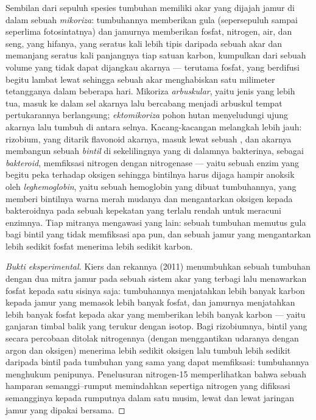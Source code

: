 \begin{proposition}\label{prop:b2:living-soil:symbiosis}
Sembilan dari sepuluh spesies tumbuhan memiliki akar yang dijajah jamur
di dalam sebuah \emph{mikoriza}: tumbuhannya memberikan gula
(sepersepuluh sampai seperlima fotosintatnya) dan jamurnya memberikan
fosfat, nitrogen, air, dan seng, yang hifanya, yang seratus kali lebih
tipis daripada sebuah akar dan memanjang seratus kali panjangnya tiap
satuan karbon, kumpulkan dari sebuah volume  yang tidak dapat
dijangkau akarnya --- terutama fosfat, yang berdifusi begitu lambat
lewat  sehingga sebuah akar menghabiskan satu milimeter
tetangganya dalam beberapa hari. Mikoriza \emph{arbuskular}, yaitu
jenis yang lebih tua, masuk ke dalam sel akarnya lalu bercabang menjadi
arbuskul tempat pertukarannya berlangsung; \emph{ektomikoriza} pohon
hutan menyeludungi ujung akarnya lalu tumbuh di antara selnya.
Kacang-kacangan melangkah lebih jauh: rizobium, yang ditarik flavonoid
akarnya, masuk lewat sebuah , dan akarnya membangun sebuah
\emph{bintil} di sekelilingnya yang di dalamnya bakterinya, sebagai
\emph{bakteroid}, memfiksasi nitrogen dengan nitrogenase --- yaitu
sebuah enzim yang begitu peka terhadap oksigen sehingga bintilnya harus
dijaga hampir anoksik oleh \emph{leghemoglobin}, yaitu sebuah
hemoglobin yang dibuat tumbuhannya, yang memberi bintilnya warna merah
mudanya dan mengantarkan oksigen kepada bakteroidnya pada sebuah
kepekatan yang terlalu rendah untuk meracuni enzimnya. Tiap mitranya
mengawasi yang lain: sebuah tumbuhan memutus gula bagi bintil yang
tidak memfiksasi apa pun, dan sebuah jamur yang mengantarkan lebih
sedikit fosfat menerima lebih sedikit karbon.
\end{proposition}
\begin{proof}[Bukti eksperimental]
Kiers dan rekannya (2011) menumbuhkan sebuah tumbuhan dengan dua mitra
jamur pada sebuah sistem akar yang terbagi lalu menawarkan fosfat
kepada satu sisinya saja: tumbuhannya menjatahkan lebih banyak karbon
kepada jamur yang memasok lebih banyak fosfat, dan jamurnya menjatahkan
lebih banyak fosfat kepada akar yang memberikan lebih banyak karbon ---
yaitu ganjaran timbal balik yang terukur dengan isotop. Bagi
rizobiumnya, bintil yang secara percobaan ditolak nitrogennya (dengan
menggantikan udaranya dengan argon dan oksigen) menerima lebih sedikit
oksigen lalu tumbuh lebih sedikit daripada bintil pada tumbuhan yang
sama yang dapat memfiksasi: tumbuhannya menghukum penipunya. Penelusuran
nitrogen-15 memperlihatkan bahwa sebuah hamparan semanggi--rumput
memindahkan sepertiga nitrogen yang difiksasi semangginya kepada
rumputnya dalam satu musim, lewat  dan lewat jaringan jamur
yang dipakai bersama.
\end{proof}

